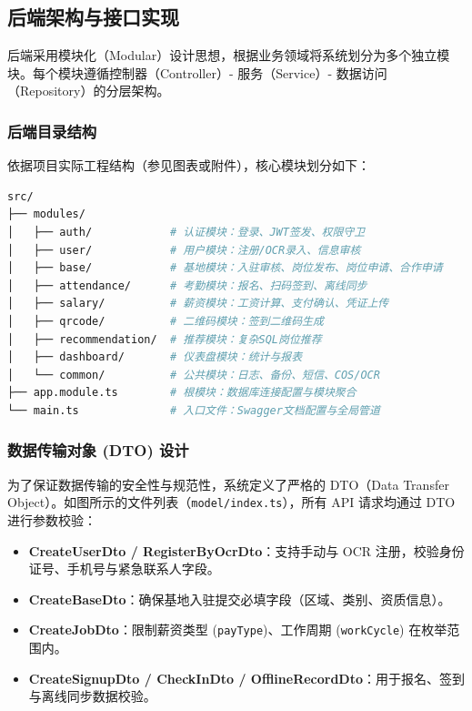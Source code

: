\documentclass[UTF8,a4paper,12pt]{article}
\begin{document}
\subsection{后端架构与接口实现}
后端采用模块化（Modular）设计思想，根据业务领域将系统划分为多个独立模块。每个模块遵循控制器（Controller）- 服务（Service）- 数据访问（Repository）的分层架构。

\subsubsection{后端目录结构}
依据项目实际工程结构（参见图表或附件），核心模块划分如下：

\begin{lstlisting}[language=bash, caption={后端核心模块目录结构}, label={code:backend_structure}]
src/
├── modules/
│   ├── auth/            # 认证模块：登录、JWT签发、权限守卫
│   ├── user/            # 用户模块：注册/OCR录入、信息审核
│   ├── base/            # 基地模块：入驻审核、岗位发布、岗位申请、合作申请
│   ├── attendance/      # 考勤模块：报名、扫码签到、离线同步
│   ├── salary/          # 薪资模块：工资计算、支付确认、凭证上传
│   ├── qrcode/          # 二维码模块：签到二维码生成
│   ├── recommendation/  # 推荐模块：复杂SQL岗位推荐
│   ├── dashboard/       # 仪表盘模块：统计与报表
│   └── common/          # 公共模块：日志、备份、短信、COS/OCR
├── app.module.ts        # 根模块：数据库连接配置与模块聚合
└── main.ts              # 入口文件：Swagger文档配置与全局管道
\end{lstlisting}

\subsubsection{数据传输对象 (DTO) 设计}
为了保证数据传输的安全性与规范性，系统定义了严格的 DTO（Data Transfer Object）。如图所示的文件列表（\texttt{model/index.ts}），所有 API 请求均通过 DTO 进行参数校验：

\begin{itemize}
    \item \textbf{CreateUserDto / RegisterByOcrDto}：支持手动与 OCR 注册，校验身份证号、手机号与紧急联系人字段。
    \item \textbf{CreateBaseDto}：确保基地入驻提交必填字段（区域、类别、资质信息）。
    \item \textbf{CreateJobDto}：限制薪资类型 (\texttt{payType})、工作周期 (\texttt{workCycle}) 在枚举范围内。
    \item \textbf{CreateSignupDto / CheckInDto / OfflineRecordDto}：用于报名、签到与离线同步数据校验。
\end{itemize}
\end{document}
